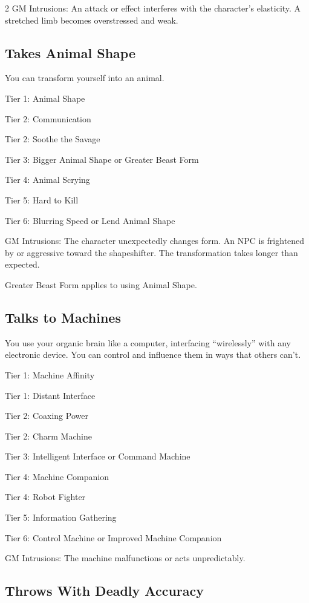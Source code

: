 \begin{multicols}{2}
GM Intrusions: An attack or effect interferes with the character’s elasticity. A stretched limb becomes overstressed and weak.

\subsection{Takes Animal Shape}

You can transform yourself into an animal. 

Tier 1: Animal Shape

Tier 2: Communication 

Tier 2: Soothe the Savage

Tier 3: Bigger Animal Shape or Greater Beast Form

Tier 4: Animal Scrying

Tier 5: Hard to Kill

Tier 6: Blurring Speed or Lend Animal Shape

GM Intrusions: The character unexpectedly changes form. An NPC is frightened by or aggressive toward the shapeshifter. The transformation takes longer than expected.

Greater Beast Form applies to using Animal Shape.

\subsection{Talks to Machines}

You use your organic brain like a computer, interfacing “wirelessly” with any electronic device. You can control and influence them in ways that others can’t.

Tier 1: Machine Affinity

Tier 1: Distant Interface

Tier 2: Coaxing Power

Tier 2: Charm Machine

Tier 3: Intelligent Interface or Command Machine

Tier 4: Machine Companion

Tier 4: Robot Fighter

Tier 5: Information Gathering

Tier 6: Control Machine or Improved Machine Companion

GM Intrusions: The machine malfunctions or acts unpredictably. 

\subsection{Throws With Deadly Accuracy}


\end{multicols}
